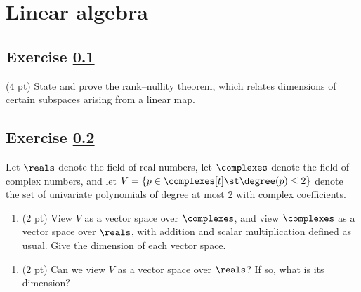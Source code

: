 %
%



%
%

\section*{Linear algebra}



\subsection{Exercise \ref{sec : me00laQ1}}
\label{sec : me00laQ1}

(4 pt) State and prove the rank--nullity theorem, which relates dimensions of certain subspaces arising from a linear map.

\spaceSolution{2.5in}{%
}%



\subsection{Exercise \ref{sec : me00laQ2}}
\label{sec : me00laQ2}

Let $\reals$ denote the field of real numbers, let $\complexes$ denote the field of complex numbers, and let $V = \{p \in \complexes[t] \st \degree(p) \leq 2\}$ denote the set of univariate polynomials of degree at most $2$ with complex coefficients.

\begin{enumerate}[label=(\alph*)]
\item\label{itm : me00laQ2a} (2 pt) View $V$ as a vector space over $\complexes$, and view $\complexes$ as a vector space over $\reals$, with addition and scalar multiplication defined as usual. Give the dimension of each vector space.
\end{enumerate}

\spaceSolution{1in}{%
}%

\begin{enumerate}[resume, label=(\alph*)]
\item\label{itm : me00laQ2b} (2 pt) Can we view $V$ as a vector space over $\reals$? If so, what is its dimension?
\end{enumerate}

\spaceSolution{1in}{%
}%


